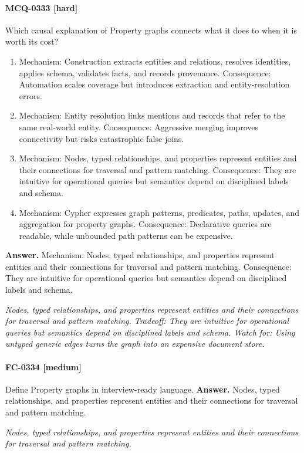 \paragraph{MCQ-0333 [hard]} Which causal explanation of Property graphs connects what it does to when it is worth its cost?
\begin{enumerate}[label=\Alph*.]
\item Mechanism: Construction extracts entities and relations, resolves identities, applies schema, validates facts, and records provenance. Consequence: Automation scales coverage but introduces extraction and entity-resolution errors.
\item Mechanism: Entity resolution links mentions and records that refer to the same real-world entity. Consequence: Aggressive merging improves connectivity but risks catastrophic false joins.
\item Mechanism: Nodes, typed relationships, and properties represent entities and their connections for traversal and pattern matching. Consequence: They are intuitive for operational queries but semantics depend on disciplined labels and schema.
\item Mechanism: Cypher expresses graph patterns, predicates, paths, updates, and aggregation for property graphs. Consequence: Declarative queries are readable, while unbounded path patterns can be expensive.
\end{enumerate}
\noindent\textbf{Answer.} Mechanism: Nodes, typed relationships, and properties represent entities and their connections for traversal and pattern matching. Consequence: They are intuitive for operational queries but semantics depend on disciplined labels and schema.
\par\textit{Nodes, typed relationships, and properties represent entities and their connections for traversal and pattern matching. Tradeoff: They are intuitive for operational queries but semantics depend on disciplined labels and schema. Watch for: Using untyped generic edges turns the graph into an expensive document store.}
\paragraph{FC-0334 [medium]} Define Property graphs in interview-ready language.
\noindent\textbf{Answer.} Nodes, typed relationships, and properties represent entities and their connections for traversal and pattern matching.
\par\textit{Nodes, typed relationships, and properties represent entities and their connections for traversal and pattern matching.}
